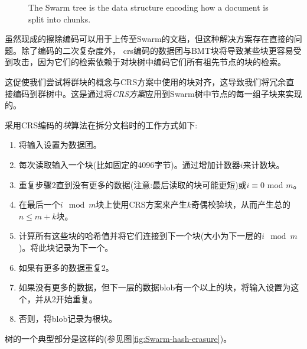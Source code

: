\begin{figure}[htbp]
   \centering
   
   \caption[Swarm hash split \statusgreen]{The Swarm tree is the data structure encoding how a document is split into chunks.}
   \label{fig:Swarm-hash-split}
\end{figure}

虽然现成的擦除编码可以用于上传至Swarm的文档，但这种解决方案存在直接的问题。除了编码的二次复杂度外， crs编码的数据团与BMT块将导致某些块更容易受到攻击，因为它们的检索依赖于对块树中编码它们所有祖先节点的块的检索。

这促使我们尝试将群块的概念与CRS方案中使用的块对齐，这导致我们将冗余直接编码到群树中。这是通过将\emph{CRS方案}应用到Swarm树中节点的每一组子块来实现的。

采用CRS编码的\emph{块}算法在拆分文档时的工作方式如下:

\begin{enumerate}
\item 将输入设置为数据团。
\item 每次读取输入一个块(比如固定的4096字节)。通过增加计数器$i$来计数块。 
\item 重复步骤2直到没有更多的数据(注意:最后读取的块可能更短)或$i \equiv 0$ mod $m$。
\item 在最后一个$i \mod m$块上使用CRS方案来产生$k$奇偶校验块，从而产生总的$n \leq m+k$块。
\item 计算所有这些块的哈希值并将它们连接到下一个块(大小为下一层的$i\mod m$)。将此块记录为下一个。
\item 如果有更多的数据重复2。 
\item 如果没有更多的数据，但下一层的数据blob有一个以上的块，将输入设置为这个，并从2开始重复。
\item 否则，将blob记录为根块。
\end{enumerate}


树的一个典型部分是这样的(参见图\ref{fig:Swarm-hash-erasure})。


